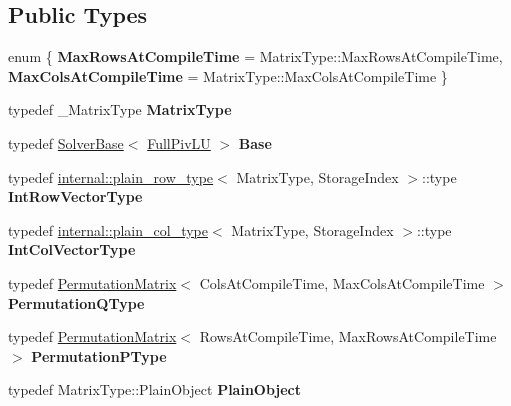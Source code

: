 \subsection*{Public Types}
\begin{DoxyCompactItemize}
\item 
\mbox{\label{class_eigen_1_1_full_piv_l_u_af2ea178bf6595755dd5cc5afef0175bb}} 
enum \{ {\bfseries Max\+Rows\+At\+Compile\+Time} = Matrix\+Type\+::Max\+Rows\+At\+Compile\+Time, 
{\bfseries Max\+Cols\+At\+Compile\+Time} = Matrix\+Type\+::Max\+Cols\+At\+Compile\+Time
 \}
\item 
\mbox{\label{class_eigen_1_1_full_piv_l_u_a1a547b7b88b78d66a86d58e7250e71cd}} 
typedef \+\_\+\+Matrix\+Type {\bfseries Matrix\+Type}
\item 
\mbox{\label{class_eigen_1_1_full_piv_l_u_a7dbfc3b86bdc6ac0353f6822aaf6e83d}} 
typedef \mbox{\hyperlink{class_eigen_1_1_solver_base}{Solver\+Base}}$<$ \mbox{\hyperlink{class_eigen_1_1_full_piv_l_u}{Full\+Piv\+LU}} $>$ {\bfseries Base}
\item 
\mbox{\label{class_eigen_1_1_full_piv_l_u_a5d9f1e67b690ba1e644459beea9dfbd4}} 
typedef \mbox{\hyperlink{struct_eigen_1_1internal_1_1plain__row__type}{internal\+::plain\+\_\+row\+\_\+type}}$<$ Matrix\+Type, Storage\+Index $>$\+::type {\bfseries Int\+Row\+Vector\+Type}
\item 
\mbox{\label{class_eigen_1_1_full_piv_l_u_a458b3a9507557e466256e1de43472981}} 
typedef \mbox{\hyperlink{struct_eigen_1_1internal_1_1plain__col__type}{internal\+::plain\+\_\+col\+\_\+type}}$<$ Matrix\+Type, Storage\+Index $>$\+::type {\bfseries Int\+Col\+Vector\+Type}
\item 
\mbox{\label{class_eigen_1_1_full_piv_l_u_a9fd5533ea778e72590b05c8b00e6b430}} 
typedef \mbox{\hyperlink{class_eigen_1_1_permutation_matrix}{Permutation\+Matrix}}$<$ Cols\+At\+Compile\+Time, Max\+Cols\+At\+Compile\+Time $>$ {\bfseries Permutation\+Q\+Type}
\item 
\mbox{\label{class_eigen_1_1_full_piv_l_u_ab2b1221f54f6403e9f9d96e12ee50fac}} 
typedef \mbox{\hyperlink{class_eigen_1_1_permutation_matrix}{Permutation\+Matrix}}$<$ Rows\+At\+Compile\+Time, Max\+Rows\+At\+Compile\+Time $>$ {\bfseries Permutation\+P\+Type}
\item 
\mbox{\label{class_eigen_1_1_full_piv_l_u_a2e642045d79065fed9a4308e762960dd}} 
typedef Matrix\+Type\+::\+Plain\+Object {\bfseries Plain\+Object}
\end{DoxyCompactItemize}
